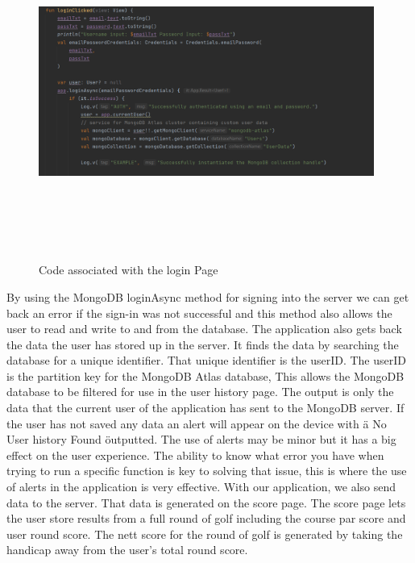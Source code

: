 \begin{figure}[H]
    \centering
    \includegraphics[width=11cm, height = 11cm]{img/mongoSignIn.PNG}
    \caption{Code associated with the login Page}
    \label{fig:altas config}
\end{figure}
By using the MongoDB loginAsync method for signing into the server we can get back an error if the sign-in was not successful and this method also allows the user to read and write to and from the database.
\newline
The application also gets back the data the user has stored up in the server. It finds the data by searching the database for a unique identifier. That unique identifier is the userID. The userID is the partition key for the MongoDB Atlas database, This allows the MongoDB database to be filtered for use in the user history page. The output is only the data that the current user of the application has sent to the MongoDB server. \newline
If the user has not saved any data an alert will appear on the device with \" a No User history Found \" outputted. The use of alerts may be minor but it has a big effect on the user experience. The ability to know what error you have when trying to run a specific function is key to solving that issue, this is where the use of alerts in the application is very effective.
\newpage
With our application, we also send data to the server. That data is generated on the score page. The score page lets the user store results from a full round of golf including the course par score and user round score. The nett score for the round of golf is generated by taking the handicap away from the user’s total round score.

